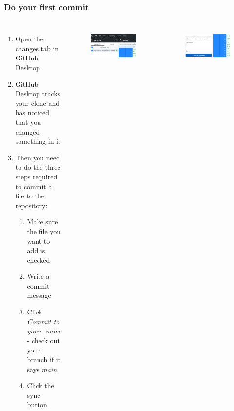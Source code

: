 \documentclass[aspectratio=169]{beamer} %
\begin{document}
\begin{frame}
\frametitle{Do your first commit}

\begin{columns}[c]


\begin{enumerate}
	\item Open the changes tab in GitHub Desktop
	\item GitHub Desktop tracks your clone and has noticed that you changed something in it
	\item Then you need to do the three steps required to commit a file to the repository:
	\begin{enumerate}
		\item Make sure the file you want to add is checked
		\item Write a commit message
		\item Click \textit{Commit to your\_name} - check out your branch if it says \textit{main}
		\item Click the sync button
	\end{enumerate}
\end{enumerate}

\begin{figure}
	\centering
	\includegraphics[width=1\linewidth]{img/desktop_changes}
	\label{fig:desktopchanges}
\end{figure}

\vspace{-1cm}

\begin{figure}
	\centering
	\includegraphics[width=1\linewidth]{img/desktop_commit}
	\label{fig:desktop_commit}
\end{figure}


\end{columns}
\end{frame}
\end{document}
